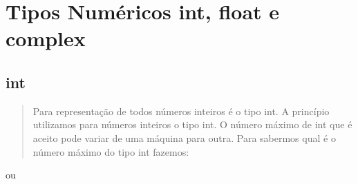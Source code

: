 \documentclass[letterpaper,10pt,brazil]{sphinxmanual}
\begin{document}
\begin{sphinxVerbatim}[commandchars=\\\{\}]
\end{sphinxVerbatim}

\begin{sphinxVerbatim}[commandchars=\\\{\}]
\end{sphinxVerbatim}

\begin{sphinxVerbatim}[commandchars=\\\{\}]
\end{sphinxVerbatim}


\chapter{Tipos Numéricos \sphinxhyphen{} int, float e complex}
\label{\detokenize{content/numeric_data_types:tipos-numericos-int-float-e-complex}}\label{\detokenize{content/numeric_data_types::doc}}

\section{int}
\label{\detokenize{content/numeric_data_types:int}}\begin{quote}

Para representação de todos números inteiros é o tipo int.
A princípio utilizamos para números inteiros o tipo int. O número máximo de int que é aceito pode variar de uma máquina para outra.
Para sabermos qual é o número máximo do tipo int fazemos:
\end{quote}

\begin{sphinxVerbatim}[commandchars=\\\{\}]
  
\end{sphinxVerbatim}

ou

\begin{sphinxVerbatim}[commandchars=\\\{\}]
  
\end{sphinxVerbatim}
\end{document}
